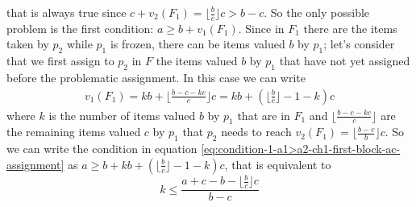 \documentclass{article}
\begin{document}
that is always true since $ c  + v_2(F_1) = \lfloor \frac{b}{c}\rfloor c > b-c$. So the only possible problem is the first condition: $a \ge  b + v_1(F_1)$. Since in $F_1$ there are the items taken by $p_2$ while $p_1$ is frozen, there can be items valued $b$ by $p_1$; let's consider that we first assign to $p_2$ in $F$ the items valued $b$ by $p_1$ that have not yet assigned before the problematic assignment. In this case we can write
\begin{align}
    v_1(F_1) = kb + \lfloor \frac{b-c-kc}{c}\rfloor c = kb + (\lfloor \frac{b}{c}\rfloor -1-k)c
\end{align}
where $k$ is the number of items valued $b$ by $p_1$ that are in $F_1$ and $\lfloor \frac{b-c-kc}{c}\rfloor$ are the remaining items valued $c$ by $p_1$ that $p_2$ needs to reach $v_2(F_1)  = \lfloor \frac{b-c}{b}\rfloor c$. So we can write the condition in equation \ref{eq:condition-1-a1>a2-ch1-first-block-ac-assignment} as $a \ge b +kb + (\lfloor \frac{b}{c}\rfloor -1-k)c $, that is equivalent to 
\begin{equation}
    k \le \frac{a + c - b - \lfloor \frac{b}{c}\rfloor c }{b-c}
    \label{eq:condition-1-a1>a2-ch1-first-block-ac-assignment-on-k}
\end{equation}
\end{document}
